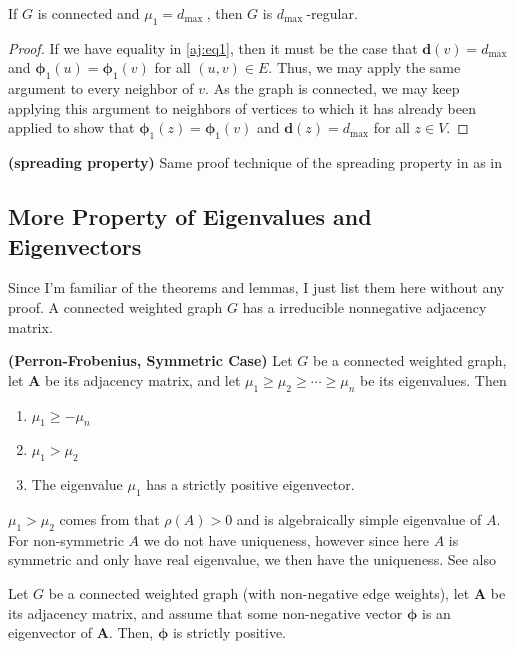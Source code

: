 \documentclass{article}
\newcommand{\bsl}[1]{\boldsymbol{#1}}
\newcommand{\bfs}[1]{\textbf{({#1}) }}
\begin{document}
\begin{lema}
  If $G$ is connected and $\mu_{1}=d_{\text {max }}$, then $G$ is $d_{\text {max }}$-regular.
\end{lema} 
\begin{proof}
If we have equality in \cref{aj:eq1}, then it must be the case that $\bsl{d}(v)=d_{\max }$ and $\boldsymbol{\phi}_{1}(u)=\bsl{\phi}_{1}(v)$ for all $(u, v) \in E .$ Thus, we may apply the same argument to every neighbor of $v .$ As the graph is connected, we may keep applying this argument to neighbors of vertices to which it has already been applied to show that $\bsl{\phi}_{1}(z)=\bsl{\phi}_{1}(v)$ and $\bsl{d}(z)=d_{\max }$ for all $z \in V$.
\end{proof}  
\begin{rema}{\bfs{spreading property}}
Same proof technique of the spreading property in as in \cite[Page397]{horn2012matrix} 
\end{rema}
\subsection{More Property of Eigenvalues and Eigenvectors}
Since I'm familiar of the theorems and lemmas, I just list them here without any proof. A connected weighted graph $G$ has a irreducible nonnegative adjacency matrix.

\begin{lema}{\bfs{Perron-Frobenius, Symmetric Case}}
  Let $G$ be a connected weighted graph, let $\boldsymbol{A}$ be its adjacency matrix, and let $\mu_{1} \geq \mu_{2} \geq \cdots \geq \mu_{n}$ be its eigenvalues. Then
  \begin{enumerate}
      \item $\mu_{1} \geq-\mu_{n}$
      \item $\mu_{1}>\mu_{2}$
      \item The eigenvalue $\mu_{1}$ has a strictly positive eigenvector.
  \end{enumerate}
\end{lema} 
\begin{rema}
$\mu_{1}>\mu_{2}$ comes from that $\rho(A)>0$ and is algebraically simple eigenvalue of $A$. For non-symmetric $A$ we do not have uniqueness, however since here $A$ is  symmetric and only have real eigenvalue, we then have the uniqueness. See also \cite[534]{horn2012matrix}
\end{rema}

\begin{lema}
  Let $G$ be a connected weighted graph (with non-negative edge weights), let $\boldsymbol{A}$ be its adjacency matrix, and assume that some non-negative vector $\bsl{\phi}$ is an eigenvector of $\boldsymbol{A} .$ Then, $\boldsymbol{\phi}$ is strictly positive.
\end{lema} 
\end{document}
